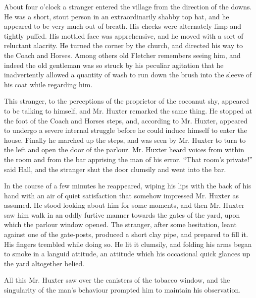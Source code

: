 About four o’clock a stranger entered the village from the direction of the downs. He was a short, stout person in an extraordinarily shabby top hat, and he appeared to be very much out of breath. His cheeks were alternately limp and tightly puffed. His mottled face was apprehensive, and he moved with a sort of reluctant alacrity. He turned the corner by the church, and directed his way to the Coach and Horses. Among others old Fletcher remembers seeing him, and indeed the old gentleman was so struck by his peculiar agitation that he inadvertently allowed a quantity of wash to run down the brush into the sleeve of his coat while regarding him.

This stranger, to the perceptions of the proprietor of the cocoanut shy, appeared to be talking to himself, and Mr. Huxter remarked the same thing. He stopped at the foot of the Coach and Horses steps, and, according to Mr. Huxter, appeared to undergo a severe internal struggle before he could induce himself to enter the house. Finally he marched up the steps, and was seen by Mr. Huxter to turn to the left and open the door of the parlour. Mr. Huxter heard voices from within the room and from the bar apprising the man of his error. “That room’s private!” said Hall, and the stranger shut the door clumsily and went into the bar.

In the course of a few minutes he reappeared, wiping his lips with the back of his hand with an air of quiet satisfaction that somehow impressed Mr. Huxter as assumed. He stood looking about him for some moments, and then Mr. Huxter saw him walk in an oddly furtive manner towards the gates of the yard, upon which the parlour window opened. The stranger, after some hesitation, leant against one of the gate-posts, produced a short clay pipe, and prepared to fill it. His fingers trembled while doing so. He lit it clumsily, and folding his arms began to smoke in a languid attitude, an attitude which his occasional quick glances up the yard altogether belied.

All this Mr. Huxter saw over the canisters of the tobacco window, and the singularity of the man’s behaviour prompted him to maintain his observation.

